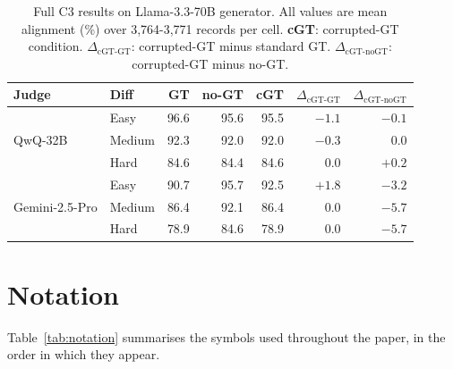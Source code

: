 \begin{table}[!htbp]
\centering
\small
\setlength{\tabcolsep}{4.5pt}
\renewcommand{\arraystretch}{1.1}
\caption{Full C3 results on Llama-3.3-70B generator. All values are mean alignment (\%) over 3,764-3,771 records per cell.
\textbf{cGT}: corrupted-GT condition. \textbf{$\Delta_{\text{cGT-GT}}$}: corrupted-GT minus standard GT.
\textbf{$\Delta_{\text{cGT-noGT}}$}: corrupted-GT minus no-GT.}
\label{tab:c3-full}
\begin{tabular}{@{}llrrrrr@{}}
\toprule
\textbf{Judge} & \textbf{Diff} & \textbf{GT} & \textbf{no-GT} & \textbf{cGT} & \textbf{$\Delta_{\text{cGT-GT}}$} & \textbf{$\Delta_{\text{cGT-noGT}}$} \\
\midrule
\multirow{3}{*}{QwQ-32B}
  & Easy   & 96.6 & 95.6 & 95.5 & $-1.1$ & $-0.1$ \\
  & Medium & 92.3 & 92.0 & 92.0 & $-0.3$ & $\phantom{-}0.0$ \\
  & Hard   & 84.6 & 84.4 & 84.6 & $\phantom{-}0.0$ & $+0.2$ \\
\midrule
\multirow{3}{*}{Gemini-2.5-Pro}
  & Easy   & 90.7 & 95.7 & 92.5 & $+1.8$ & $-3.2$ \\
  & Medium & 86.4 & 92.1 & 86.4 & $\phantom{-}0.0$ & $-5.7$ \\
  & Hard   & 78.9 & 84.6 & 78.9 & $\phantom{-}0.0$ & $-5.7$ \\
\bottomrule
\end{tabular}
\end{table}

\section{Notation}
\label{app:notation}

Table~\ref{tab:notation} summarises the symbols used throughout the paper, in the order in which they appear.

